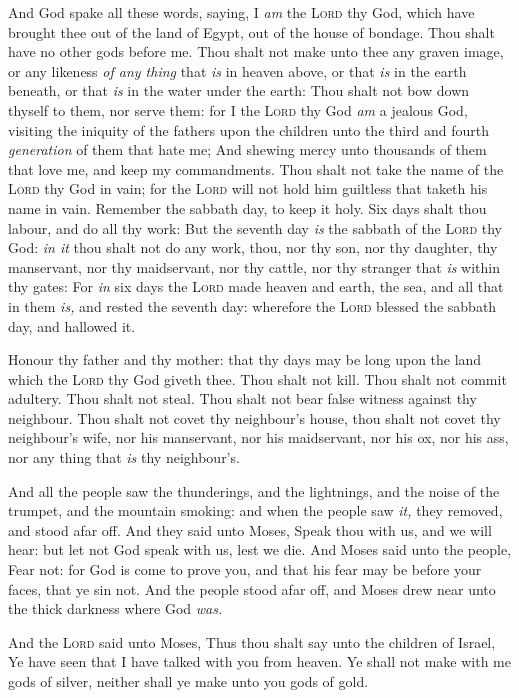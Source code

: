 \documentclass[11pt,letterpaper,oneside]{memoir}
\begin{document}
And God spake all these words, saying, I \emph{am} the \textsc{Lord} thy
God, which have brought thee out of the land of Egypt, out of the house
of bondage. Thou shalt have no other gods before me. Thou shalt not make
unto thee any graven image, or any likeness \emph{of any thing} that
\emph{is} in heaven above, or that \emph{is} in the earth beneath, or
that \emph{is} in the water under the earth: Thou shalt not bow down
thyself to them, nor serve them: for I the \textsc{Lord} thy God
\emph{am} a jealous God, visiting the iniquity of the fathers upon the
children unto the third and fourth \emph{generation} of them that hate
me; And shewing mercy unto thousands of them that love me, and keep my
commandments. Thou shalt not take the name of the \textsc{Lord} thy God
in vain; for the \textsc{Lord} will not hold him guiltless that taketh
his name in vain. Remember the sabbath day, to keep it holy. Six days
shalt thou labour, and do all thy work: But the seventh day \emph{is}
the sabbath of the \textsc{Lord} thy God: \emph{in it} thou shalt not do
any work, thou, nor thy son, nor thy daughter, thy manservant, nor thy
maidservant, nor thy cattle, nor thy stranger that \emph{is} within thy
gates: For \emph{in} six days the \textsc{Lord} made heaven and earth,
the sea, and all that in them \emph{is,} and rested the seventh day:
wherefore the \textsc{Lord} blessed the sabbath day, and hallowed it.

Honour thy father and thy mother: that thy days may be long upon the
land which the \textsc{Lord} thy God giveth thee. Thou shalt not kill.
Thou shalt not commit adultery. Thou shalt not steal. Thou shalt not
bear false witness against thy neighbour. Thou shalt not covet thy
neighbour's house, thou shalt not covet thy neighbour's wife, nor his
manservant, nor his maidservant, nor his ox, nor his ass, nor any thing
that \emph{is} thy neighbour's.

And all the people saw the thunderings, and the lightnings, and the
noise of the trumpet, and the mountain smoking: and when the people saw
\emph{it,} they removed, and stood afar off. And they said unto Moses,
Speak thou with us, and we will hear: but let not God speak with us,
lest we die. And Moses said unto the people, Fear not: for God is come
to prove you, and that his fear may be before your faces, that ye sin
not. And the people stood afar off, and Moses drew near unto the thick
darkness where God \emph{was.}

And the \textsc{Lord} said unto Moses, Thus thou shalt say unto the
children of Israel, Ye have seen that I have talked with you from
heaven. Ye shall not make with me gods of silver, neither shall ye make
unto you gods of gold.
\end{document}
